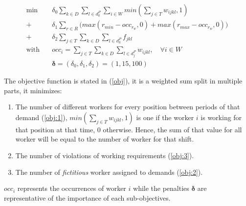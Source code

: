 \documentclass[../../thesis.tex]{subfiles}
\begin{document}
\begingroup
\allowdisplaybreaks
\begin{subequations}
  \label{obj}
  \begin{align}
    \textrm{min} \quad & \delta_0 \sum_{k \in D} \sum_{l \in d^P_k} \sum_{i \in W} min(\sum_{j \in T} w_{ijkl}, 1) \label{obj:1} \\ 
      + \ & \delta_1 \sum_{r \in R} \big( max(r_{min} - occ_{r_{w}}, 0) + max(r_{max} - occ_{r_{w}}, 0) \big)  \label{obj:3} \\ 
      + \ &\delta_2 \sum_{j \in T}\sum_{k\in D}\sum_{l \in d^P_k} f_{jkl} \label{obj:2} \\ 
     \textrm{with} \quad & occ_i = \sum_{j \in T} \sum_{k \in D} \sum_{l \in d^P_j} w_{ijkl}, \quad \forall i \in W  \nonumber \\ 
                         & \bm{\delta} = (\delta_0, \delta_1, \delta_2) = (1, 15, 100) \nonumber
  \end{align}
\end{subequations}
\endgroup


The objective function is stated in (\ref{obj}), it is a weighted sum split in multiple parts, it minimizes:

\begin{enumerate}
  \item The number of different workers for every position between periods of that demand (\ref{obj:1}), $min(\sum_{j \in T} w_{ijkl}, 1)$ is one if the worker $i$ is working for that position at that time, 0 otherwise. Hence, the sum of that value for all worker will be equal to the number of worker for that shift.
  \item The number of violations of working requirements (\ref{obj:3}).
  \item The number of \emph{fictitious} worker assigned to demands (\ref{obj:2}).
\end{enumerate}

$occ_i$ represents the occurrences of worker $i$ while the penalties $\bm{\delta}$ are representative of the importance of each sub-objectives.

\end{document}
